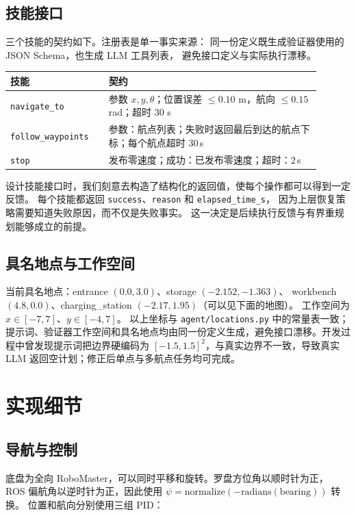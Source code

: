 \documentclass[10pt,twocolumn]{ctexart}
\begin{document}
\subsection{技能接口}
三个技能的契约如下。注册表是单一事实来源：
同一份定义既生成验证器使用的 JSON Schema，也生成 LLM 工具列表，
避免接口定义与实际执行漂移。

\begin{center}
\setlength{\tabcolsep}{3pt}
\footnotesize
\begin{tabular}{p{0.29\linewidth}p{0.61\linewidth}}
\toprule
技能 & 契约 \\
\midrule
\texttt{navigate\_to} &
参数 $x,y,\theta$；位置误差 $\le 0.10$ m，航向 $\le 0.15$ rad；超时 30 s \\
\texttt{follow\_waypoints} &
参数：航点列表；失败时返回最后到达的航点下标；每个航点超时 30\,s \\
\texttt{stop} &
发布零速度；成功：已发布零速度；超时：2\,s \\
\bottomrule
\end{tabular}
\end{center}

设计技能接口时，我们刻意去构造了结构化的返回值，使每个操作都可以得到一定反馈。
每个技能都返回 \texttt{success}、\texttt{reason} 和 \texttt{elapsed\_time\_s}，
因为上层恢复策略需要知道失败原因，而不仅是失败事实。
这一决定是后续执行反馈与有界重规划能够成立的前提。

\subsection{具名地点与工作空间}
当前具名地点：entrance $(0.0,3.0)$、storage $(-2.152,-1.363)$、
workbench $(4.8,0.0)$、charging\_station $(-2.17,1.95)$（可以见下面的地图）。
工作空间为 $x \in [-7,7]$、$y \in [-4,7]$。
以上坐标与 \texttt{agent/locations.py} 中的常量表一致；提示词、验证器工作空间和具名地点均由同一份定义生成，避免接口漂移。开发过程中曾发现提示词把边界硬编码为 $[-1.5,1.5]^2$，与真实边界不一致，导致真实 LLM 返回空计划；修正后单点与多航点任务均可完成。

\section{实现细节}
\label{sec:impl}

\subsection{导航与控制}
底盘为全向 RoboMaster，可以同时平移和旋转。罗盘方位角以顺时针为正，
ROS 偏航角以逆时针为正，因此使用
$\psi = \mathrm{normalize}(-\mathrm{radians}(\mathrm{bearing}))$ 转换。
位置和航向分别使用三组 PID：
\end{document}
